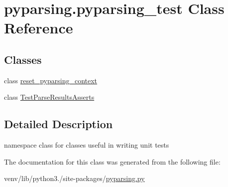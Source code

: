 \hypertarget{classpyparsing_1_1pyparsing__test}{}\section{pyparsing.\+pyparsing\+\_\+test Class Reference}
\label{classpyparsing_1_1pyparsing__test}
\subsection*{Classes}
\begin{DoxyCompactItemize}
\item 
class \hyperlink{classpyparsing_1_1pyparsing__test_1_1reset__pyparsing__context}{reset\+\_\+pyparsing\+\_\+context}
\item 
class \hyperlink{classpyparsing_1_1pyparsing__test_1_1TestParseResultsAsserts}{Test\+Parse\+Results\+Asserts}
\end{DoxyCompactItemize}


\subsection{Detailed Description}
\begin{DoxyVerb}namespace class for classes useful in writing unit tests
\end{DoxyVerb}
 

The documentation for this class was generated from the following file\+:\begin{DoxyCompactItemize}
\item 
venv/lib/python3./site-\/packages/\hyperlink{pyparsing_8py}{pyparsing.\+py}\end{DoxyCompactItemize}
